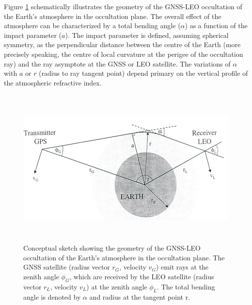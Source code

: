 \documentclass[a4paper,12pt,twoside]{article}
\begin{document}
\noindent Figure \ref{fig:img30} schematically illustrates the geometry of the GNSS-LEO occultation of the Earth's atmosphere in the occultation plane. The overall effect of the atmosphere can be characterized by a total bending angle ($\alpha$) as a function of the impact parameter ($a$). The impact parameter is defined, assuming spherical symmetry, as the perpendicular distance between the centre of the Earth (more precisely speaking, the centre of local curvature at the perigee of the occultation ray) and the ray asymptote at the GNSS or LEO satellite. The variations of $\alpha$ with $a$ or $r$ (radius to ray tangent point) depend primary on the vertical profile of the atmospheric refractive index. \\

\begin{figure}[H]
\centering
\includegraphics[width=\textwidth, height=8cm , frame]{images/Figure19.png}
\caption{Conceptual sketch showing the geometry of the GNSS-LEO occultation of the Earth's atmosphere in the occultation plane. The GNSS satellite (radius vector $r_{G}$, velocity $v_{G}$) emit rays at the zenith angle $\phi_{G}$, which are received by the LEO satellite (radius vector $r_{L}$, velocity $v_{L}$) at the zenith angle $\phi_{L}$. The total bending angle is denoted by $\alpha$ and radius at the tangent point r.}
\label{fig:img30}
\end{figure}
\end{document}
